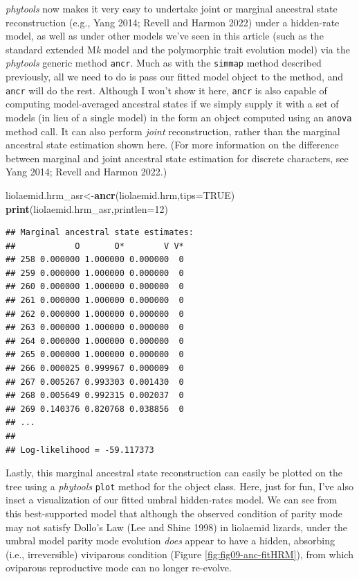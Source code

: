 \documentclass[fleqn,10pt,lineno]{wlpeerj} %
\newenvironment{Shaded}{\begin{snugshade}}{\end{snugshade}}
\newcommand{\AttributeTok}[1]{\textcolor[rgb]{0.13,0.29,0.53}{#1}}
\newcommand{\ConstantTok}[1]{\textcolor[rgb]{0.56,0.35,0.01}{#1}}
\newcommand{\DecValTok}[1]{\textcolor[rgb]{0.00,0.00,0.81}{#1}}
\newcommand{\FunctionTok}[1]{\textcolor[rgb]{0.13,0.29,0.53}{\textbf{#1}}}
\newcommand{\NormalTok}[1]{#1}
\newcommand{\OtherTok}[1]{\textcolor[rgb]{0.56,0.35,0.01}{#1}}
\begin{document}
\emph{phytools} now makes it very easy to undertake joint or marginal ancestral state reconstruction (e.g., Yang 2014; Revell and Harmon 2022) under a hidden-rate model, as well as under other models we've seen in this article (such as the standard extended M\emph{k} model and the polymorphic trait evolution model) via the \emph{phytools} generic method \texttt{ancr}. Much as with the \texttt{simmap} method described previously, all we need to do is pass our fitted model object to the method, and \texttt{ancr} will do the rest. Although I won't show it here, \texttt{ancr} is also capable of computing model-averaged ancestral states if we simply supply it with a set of models (in lieu of a single model) in the form an object computed using an \texttt{anova} method call. It can also perform \emph{joint} reconstruction, rather than the marginal ancestral state estimation shown here. (For more information on the difference between marginal and joint ancestral state estimation for discrete characters, see Yang 2014; Revell and Harmon 2022.)

\begin{Shaded}
\begin{Highlighting}[]
\NormalTok{liolaemid.hrm\_asr}\OtherTok{\textless{}{-}}\FunctionTok{ancr}\NormalTok{(liolaemid.hrm,}\AttributeTok{tips=}\ConstantTok{TRUE}\NormalTok{)}
\FunctionTok{print}\NormalTok{(liolaemid.hrm\_asr,}\AttributeTok{printlen=}\DecValTok{12}\NormalTok{)}
\end{Highlighting}
\end{Shaded}

\begin{verbatim}
## Marginal ancestral state estimates:
##            O       O*        V V*
## 258 0.000000 1.000000 0.000000  0
## 259 0.000000 1.000000 0.000000  0
## 260 0.000000 1.000000 0.000000  0
## 261 0.000000 1.000000 0.000000  0
## 262 0.000000 1.000000 0.000000  0
## 263 0.000000 1.000000 0.000000  0
## 264 0.000000 1.000000 0.000000  0
## 265 0.000000 1.000000 0.000000  0
## 266 0.000025 0.999967 0.000009  0
## 267 0.005267 0.993303 0.001430  0
## 268 0.005649 0.992315 0.002037  0
## 269 0.140376 0.820768 0.038856  0
## ...
## 
## Log-likelihood = -59.117373
\end{verbatim}

Lastly, this marginal ancestral state reconstruction can easily be plotted on the tree using a \emph{phytools} \texttt{plot} method for the object class. Here, just for fun, I've also inset a visualization of our fitted umbral hidden-rates model. We can see from this best-supported model that although the observed condition of parity mode may not satisfy Dollo's Law (Lee and Shine 1998) in liolaemid lizards, under the umbral model parity mode evolution \emph{does} appear to have a hidden, absorbing (i.e., irreversible) viviparous condition (Figure \ref{fig:fig09-anc-fitHRM}), from which oviparous reproductive mode can no longer re-evolve.
\end{document}
